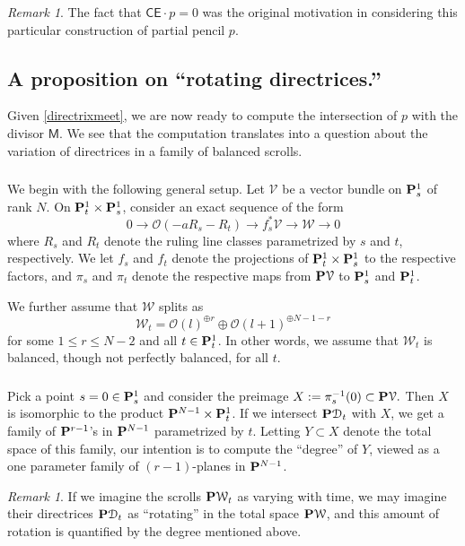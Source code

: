 \documentclass[reqno, 10 pt]{article}
\theoremstyle{definition}
\theoremstyle{remark}
\newtheorem{rmk}[thm]{Remark}
\numberwithin{equation}{section}
\numberwithin{thm}{section}
\numberwithin{prop}{section}
\numberwithin{lem}{section}
\numberwithin{cor}{section}
\numberwithin{conj}{section}
\numberwithin{defn}{section}
\newcommand{\sfCE}{{\mathsf {CE}}}
\newcommand{\sfM}{{\mathsf M}}
\renewcommand{\cD}{{\mathcal D}}
\newcommand{\cV}{{\mathcal V}}
\newcommand{\cW}{{\mathcal W}}
\renewcommand{\P}{{\bf P}}
\begin{document}
\begin{rmk}
The fact that $\sfCE \cdot p = 0$ was the original motivation in considering this particular construction of partial pencil $p$. 
\end{rmk}

\subsection{A proposition on ``rotating directrices.''} Given \autoref{directrixmeet}, we are now ready to compute the intersection of $p$ with the divisor $\sfM$. We see that the computation translates into a question about the variation of directrices in a family of balanced scrolls.

\subsubsection{}
We begin with the following general setup. Let $\cV$ be a vector bundle on ${\bf P}^1_{s}$ of rank $N$.  On ${\bf P}^1_{t} \times {\bf P}^1_{s}$, consider an exact sequence of the form \[0 \longrightarrow \mathcal{O}(-aR_s-R_t) \longrightarrow f_{s}^*\cV \longrightarrow \cW \longrightarrow 0\] where $R_{s}$ and $R_{t}$ denote the ruling line classes parametrized by $s$ and $t$, respectively. We let $f_{s}$ and $f_{t}$ denote the projections of $\P^{1}_{t} \times \P^{1}_{s}$ to the respective factors, and $\pi_{s}$ and $\pi_{t}$ denote the respective maps from $\P \cV $ to $\P^{1}_{s}$ and $\P^{1}_{t}$.


 We further assume that $\cW$ splits as \[\cW_{t} = \mathcal{O}(l)^{\oplus r} \oplus \mathcal{O}(l+1)^{\oplus N-1-r}\] for some $1 \leq r \leq N-2$ and all $t \in \P^{1}_{t}$. In other words, we assume that $\cW_{t}$ is balanced, though not perfectly balanced, for all $t$. 

\subsubsection{} 
Pick a point $s = 0 \in \P^{1}_{s}$ and consider the preimage $X := \pi_{s}^{-1}(0) \subset \P \cV.$  Then $X$ is isomorphic to the product $\P^{N-1} \times  \P^{1}_{t}$. If we intersect $\P \cD_{t}$ with $X$, we get a family of $\P^{r-1}$'s in $\P^{N-1}$ parametrized by $t$. Letting $Y \subset X$ denote the total space of this family,  our intention is to compute the ``degree'' of $Y$, viewed as a one parameter family of $(r-1)$-planes in $\P^{N-1}$. 

\begin{rmk}
If we imagine the scrolls $\P\cW_{t}$ as varying with time, we may imagine their directrices $\P \cD_{t}$ as ``rotating'' in the total space $\P\cW$, and this amount of rotation is quantified by the degree mentioned above.  
\end{rmk} 
\end{document}
